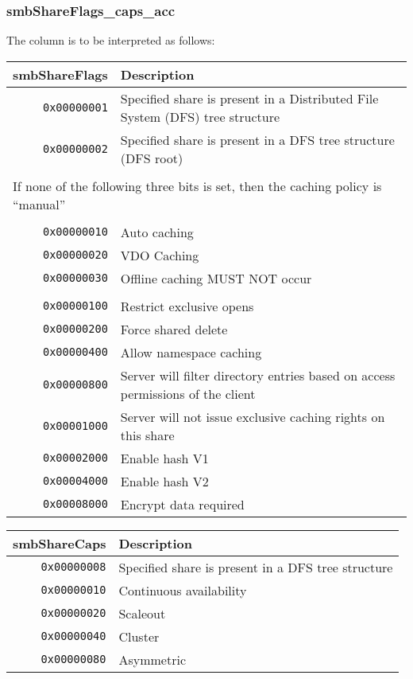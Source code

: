 \documentclass[documentation]{subfiles}
\begin{document}
\subsubsection{smbShareFlags\_caps\_acc}\label{smbShareFlagsCapsAcc}
The {\tt{}} column is to be interpreted as follows:
\begin{longtable}{rl}
    \toprule
    {\bf smbShareFlags} & {\bf Description}\\
    \midrule\endhead%
    {\tt 0x00000001} & Specified share is present in a Distributed File System (DFS) tree structure\\
    {\tt 0x00000002} & Specified share is present in a DFS tree structure (DFS root)\\\\

    \multicolumn{2}{l}{If none of the following three bits is set, then the caching policy is ``manual''}\\\\
    {\tt 0x00000010} & Auto caching\\
    {\tt 0x00000020} & VDO Caching\\
    {\tt 0x00000030} & Offline caching MUST NOT occur\\\\
    {\tt 0x00000100} & Restrict exclusive opens\\
    {\tt 0x00000200} & Force shared delete\\
    {\tt 0x00000400} & Allow namespace caching\\
    {\tt 0x00000800} & Server will filter directory entries based on access permissions of the client\\
    {\tt 0x00001000} & Server will not issue exclusive caching rights on this share\\
    {\tt 0x00002000} & Enable hash V1\\
    {\tt 0x00004000} & Enable hash V2\\
    {\tt 0x00008000} & Encrypt data required\\
    \bottomrule
\end{longtable}

\begin{longtable}{rl}
    \toprule
    {\bf smbShareCaps} & {\bf Description}\\
    \midrule\endhead%
    {\tt 0x00000008} & Specified share is present in a DFS tree structure\\
    {\tt 0x00000010} & Continuous availability\\
    {\tt 0x00000020} & Scaleout\\
    {\tt 0x00000040} & Cluster\\
    {\tt 0x00000080} & Asymmetric\\
    \bottomrule
\end{longtable}
\end{document}
